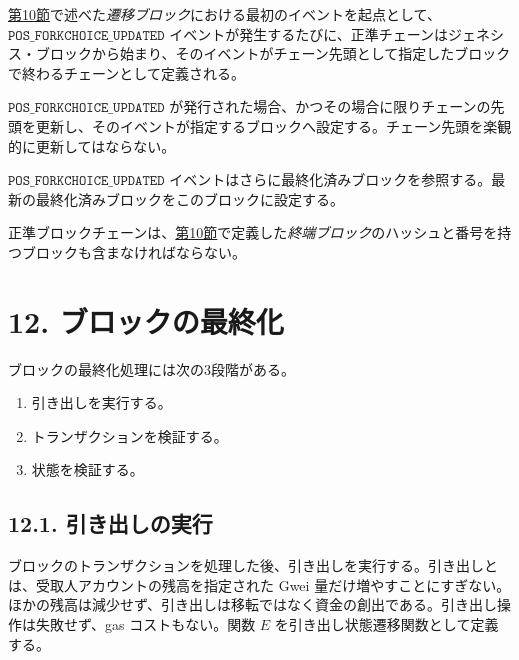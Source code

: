 \documentclass[
]{ltjsarticle}
\begin{document}
\protect\hyperlink{ch:pos_transition}{第10節}で述べた\emph{遷移ブロック}における最初のイベントを起点として、
\(\mathtt{POS\_FORKCHOICE\_UPDATED}\)
イベントが発生するたびに、正準チェーンはジェネシス・ブロックから始まり、そのイベントがチェーン先頭として指定したブロックで終わるチェーンとして定義される。

\(\mathtt{POS\_FORKCHOICE\_UPDATED}\)
が発行された場合、かつその場合に限りチェーンの先頭を更新し、そのイベントが指定するブロックへ設定する。チェーン先頭を楽観的に更新してはならない。

\(\mathtt{POS\_FORKCHOICE\_UPDATED}\)
イベントはさらに最終化済みブロックを参照する。最新の最終化済みブロックをこのブロックに設定する。

正準ブロックチェーンは、\protect\hyperlink{ch:pos_transition}{第10節}で定義した\emph{終端ブロック}のハッシュと番号を持つブロックも含まなければならない。

\protect\hypertarget{ch:finalisation}{}{}

\hypertarget{ux30d6ux30edux30c3ux30afux306eux6700ux7d42ux5316}{%
\section{12.
ブロックの最終化}\label{ux30d6ux30edux30c3ux30afux306eux6700ux7d42ux5316}}

ブロックの最終化処理には次の3段階がある。

\begin{enumerate}
\def\labelenumi{\arabic{enumi}.}
\item
  引き出しを実行する。
\item
  トランザクションを検証する。
\item
  状態を検証する。
\end{enumerate}

\hypertarget{ux5f15ux304dux51faux3057ux306eux5b9fux884c}{%
\subsection{12.1.
引き出しの実行}\label{ux5f15ux304dux51faux3057ux306eux5b9fux884c}}

ブロックのトランザクションを処理した後、引き出しを実行する。引き出しとは、受取人アカウントの残高を指定された
Gwei
量だけ増やすことにすぎない。ほかの残高は減少せず、引き出しは移転ではなく資金の創出である。引き出し操作は失敗せず、gas
コストもない。関数 \(E\) を引き出し状態遷移関数として定義する。

\protect\hypertarget{eq-177}{}{}\protect\hypertarget{eq-178}{}{}\protect\hypertarget{eq-179}{}{}
\end{document}
